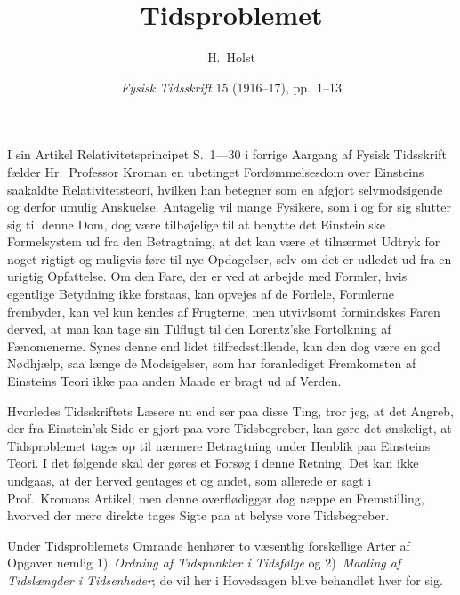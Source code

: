 \documentclass[12pt,a4paper]{article}
\title{\textbf{\guillemotleft Tidsproblemet\guillemotright}}
\author{H.\ Holst}
\date{\textit{Fysisk Tidsskrift} 15 (1916--17), pp.~1--13}
\newcommand{\opage}[1]{\marginnote{\footnotesize\textit{[#1]}}}
\begin{document}
\maketitle

\opage{1} %
I sin Artikel \guillemotleft Relativitetsprincipet\guillemotright{} S.~1---30 i
forrige Aargang af \guillemotleft Fysisk Tidsskrift\guillemotright{} fælder
Hr.~Professor Kroman en ubetinget Fordømmelsesdom over Einsteins saakaldte
Relativitetsteori, hvilken han betegner som \guillemotleft en afgjort
selvmodsigende og derfor umulig Anskuelse\guillemotright. Antagelig vil mange
Fysikere, som i og for sig slutter sig til denne Dom, dog være tilbøjelige til
at benytte det Einstein'ske Formelsystem ud fra den Betragtning, at det kan
være et tilnærmet Udtryk for noget rigtigt og muligvis føre til nye Opdagelser,
selv om det er udledet ud fra en urigtig Opfattelse. Om den Fare, der er ved at
arbejde med Formler, hvis egentlige Betydning ikke forstaas, kan opvejes af de
Fordele, Formlerne frembyder, kan vel kun kendes af Frugterne; men utvivlsomt
formindskes Faren derved, at man kan tage sin Tilflugt til den Lorentz'ske
Fortolkning af Fænomenerne. Synes denne end lidet tilfredsstillende, kan den
dog være en god Nødhjælp, saa længe de Modsigelser, som har foranlediget
Fremkomsten af Einsteins Teori ikke paa anden Maade er bragt ud af Verden.

Hvorledes Tidsskriftets Læsere nu end ser paa disse Ting, tror jeg, at det
Angreb, der fra Einstein'sk Side er gjort paa vore Tidsbegreber, kan gøre det
ønskeligt, at Tidsproblemet tages op til nærmere Betragtning under Henblik paa
Einsteins Teori. I det følgende skal der gøres et Forsøg i denne Retning. Det
kan ikke undgaas, at der herved gentages et og andet, som allerede er sagt i
Prof.\ Kromans Artikel; men denne overflødiggør dog næppe en Fremstilling,
hvorved der mere direkte tages Sigte paa at belyse vore Tidsbegreber.

\opage{2} %
Under Tidsproblemets Omraade henhører to væsentlig forskellige Arter af Opgaver
nemlig 1)~\emph{Ordning af Tidspunkter i Tidsfølge} og 2)~\emph{Maaling af
Tidslængder i Tidsenheder}; de vil her i Hovedsagen blive behandlet hver for
sig.
\end{document}

